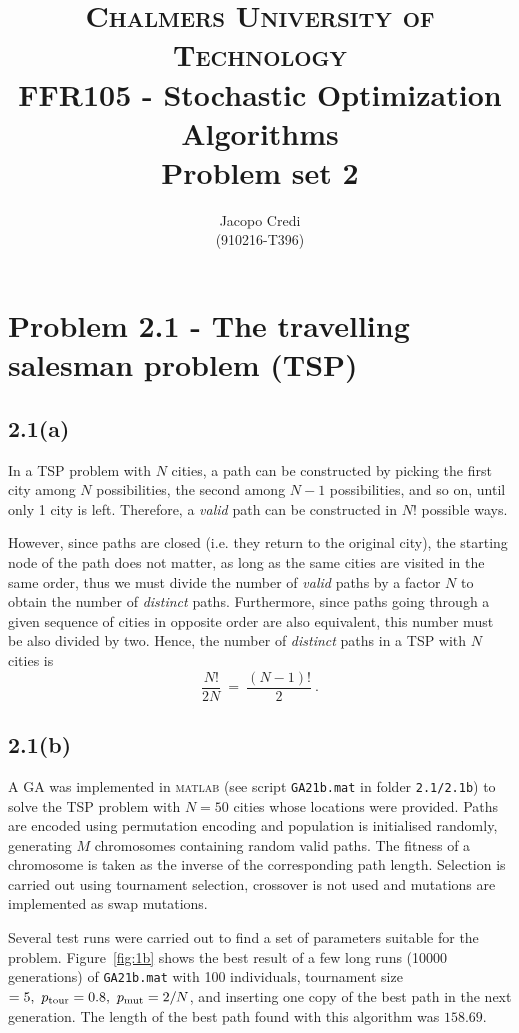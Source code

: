 \documentclass[12pt,titlepage]{article}
\author{Jacopo Credi \\(910216-T396) \\ \vspace*{2cm} }
\title{{\Large \textsc{Chalmers University of Technology}} \\ \bigskip FFR105 - Stochastic Optimization Algorithms\\ \bigskip Problem set 2 \\ \vspace*{2cm}}
\begin{document}
\parindent=0cm
\maketitle


\section*{Problem 2.1 - The travelling salesman problem (TSP)}
\setcounter{page}{1}

\subsection*{2.1(a)}
In a TSP problem with $N$ cities, a path can be constructed by picking the first city among $N$ possibilities, the second among $N-1$ possibilities, and so on, until only 1 city is left. Therefore, a \emph{valid} path can be constructed in $N!$ possible ways. 

However, since paths are closed (i.e. they return to the original city), the starting node of the path does not matter, as long as the same cities are visited in the same order, thus we must divide the number of \emph{valid} paths by a factor $N$ to obtain the number of \emph{distinct} paths.
Furthermore, since paths going through a given sequence of cities in opposite order are also equivalent, this number must be also divided by two.
Hence, the number of \emph{distinct} paths in a TSP with $N$ cities is
\[
\dfrac{N!}{2 N} \ = \ \dfrac{(N-1)!}{2} \  .
\]

\vspace*{-0.7cm}
\subsection*{2.1(b)}

A GA was implemented in \textsc{matlab} (see script \texttt{GA21b.mat} in folder \texttt{2.1/2.1b}) to solve the TSP problem with $N = 50$ cities whose locations were provided. Paths are encoded using permutation encoding and population is initialised randomly, generating $M$ chromosomes containing random valid paths. The fitness of a chromosome is taken as the inverse of the corresponding path length. Selection is carried out using tournament selection, crossover is not used and mutations are implemented as swap mutations.

Several test runs were carried out to find a set of parameters suitable for the problem.
Figure~\ref{fig:1b} shows the best result of a few long runs (10000 generations) of \texttt{GA21b.mat} with 100 individuals, tournament size $= 5, \ p_{\textup{tour}} = 0.8, \ p_{\textup{mut}} = 2/N$, and inserting one copy of the best path in the next generation.
The length of the best path found with this algorithm was $158.69$.\enlargethispage{\baselineskip}
\end{document}
